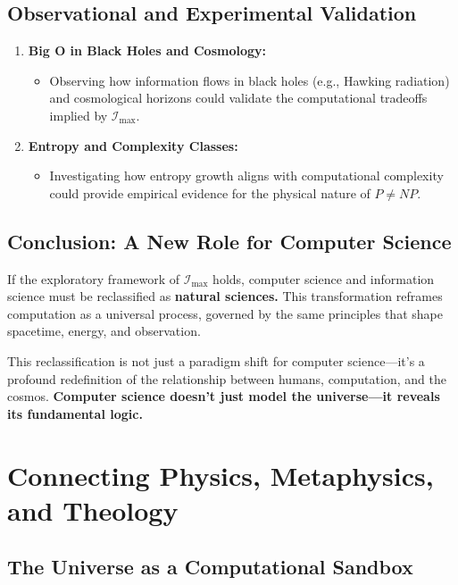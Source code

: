 \documentclass[12pt]{article}
\begin{document}
\subsection{Observational and Experimental Validation}

\begin{enumerate}
    \item \textbf{Big O in Black Holes and Cosmology:}
    \begin{itemize}
        \item Observing how information flows in black holes (e.g., Hawking radiation) and cosmological horizons could validate the computational tradeoffs implied by $\mathcal{I}_{\text{max}}$.
    \end{itemize}

    \item \textbf{Entropy and Complexity Classes:}
    \begin{itemize}
        \item Investigating how entropy growth aligns with computational complexity could provide empirical evidence for the physical nature of $P \neq NP$.
    \end{itemize}
\end{enumerate}

\subsection{Conclusion: A New Role for Computer Science}

If the exploratory framework of $\mathcal{I}_{\text{max}}$ holds, computer science and information science must be reclassified as \textbf{natural sciences.} This transformation reframes computation as a universal process, governed by the same principles that shape spacetime, energy, and observation.

This reclassification is not just a paradigm shift for computer science—it’s a profound redefinition of the relationship between humans, computation, and the cosmos. \textbf{Computer science doesn’t just model the universe—it reveals its fundamental logic.}


\section{Connecting Physics, Metaphysics, and Theology}

\subsection{The Universe as a Computational Sandbox}
\end{document}
